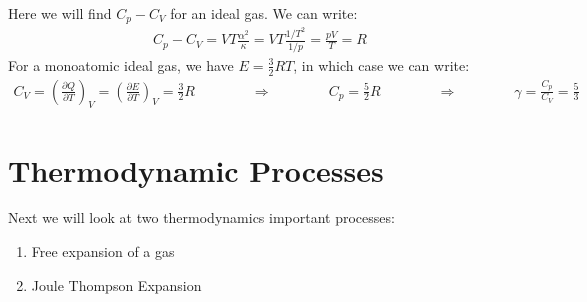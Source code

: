 \documentclass[11pt,oneside]{book}
\theoremstyle{break}
\theoremstyle{break}
\newcommand{\pd}{\partial}
\newcommand{\lr}[1]{\left( #1 \right)}
\begin{document}
Here we will find $C_p - C_V$ for an ideal gas. We can write:
\begin{align*}
C_p - C_V = VT \frac{\alpha^2}{\kappa} = VT \frac{{1}/{T^2}}{{1}/{p}} = \frac{pV}{T} = R
\end{align*}
For a monoatomic ideal gas, we have $E = \frac{3}{2}RT$, in which case we can write:
\begin{align*}
C_V = \lr{\frac{\pd Q}{\pd T}}_V = \lr{\frac{\pd E}{\pd T}}_V = \frac{3}{2}R\qquad \qquad \Rightarrow \qquad\qquad
C_p  = \frac{5}{2}R \qquad \qquad \Rightarrow \qquad \qquad \gamma = \frac{C_p}{C_V} = \frac{5}{3}
\end{align*}
\newpage

\section[Thermodynamic Processes]{\color{red}Thermodynamic Processes\color{black}}
Next we will look at two thermodynamics important processes:
\begin{enumerate}
\item Free expansion of a gas
\item Joule Thompson Expansion
\end{enumerate}
\hfill\break
\hfill\break
\end{document}
